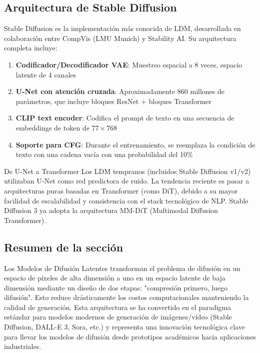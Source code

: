 \subsection{Arquitectura de Stable Diffusion}

Stable Diffusion es la implementación más conocida de LDM, desarrollada en colaboración entre CompVis (LMU Munich) y Stability AI. Su arquitectura completa incluye:

\begin{enumerate}
    \item \textbf{Codificador/Decodificador VAE}: Muestreo espacial a 8 veces, espacio latente de 4 canales
    \item \textbf{U-Net con atención cruzada}: Aproximadamente 860 millones de parámetros, que incluye bloques ResNet + bloques Transformer
    \item \textbf{CLIP text encoder}: Codifica el prompt de texto en una secuencia de embeddings de token de $77\times768$
    \item \textbf{Soporte para CFG}: Durante el entrenamiento, se reemplaza la condición de texto con una cadena vacía con una probabilidad del 10\%
\end{enumerate}

\begin{knowledgebox}{De U-Net a Transformer}
Los LDM tempranos (incluidos Stable Diffusion v1/v2) utilizaban U-Net como red predictora de ruido. La tendencia reciente es pasar a arquitecturas puras basadas en Transformer (como DiT), debido a su mayor facilidad de escalabilidad y consistencia con el stack tecnológico de NLP. Stable Diffusion 3 ya adopta la arquitectura MM-DiT (Multimodal Diffusion Transformer).
\end{knowledgebox}

\subsection{Resumen de la sección}

Los Modelos de Difusión Latentes transforman el problema de difusión en un espacio de píxeles de alta dimensión a uno en un espacio latente de baja dimensión mediante un diseño de dos etapas: "compresión primero, luego difusión". Esto reduce drásticamente los costos computacionales manteniendo la calidad de generación. Esta arquitectura se ha convertido en el paradigma estándar para modelos modernos de generación de imágenes/vídeo (Stable Diffusion, DALL-E 3, Sora, etc.) y representa una innovación tecnológica clave para llevar los modelos de difusión desde prototipos académicos hacia aplicaciones industriales.

\newpage
